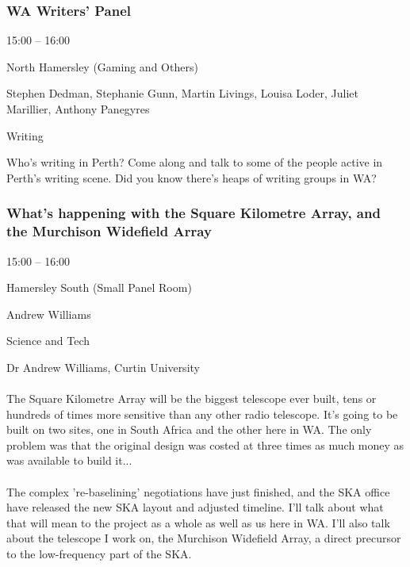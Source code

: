 \documentclass{scrreprt}
\begin{document}
\begin{multicols}{2}
\subsubsection*{WA Writers' Panel}\begin{description}
\setlength{\itemsep}{0pt}
\setlength{\parsep}{0pt}
\setlength{\parskip}{0pt}
\item[Time:]{15:00 -- 16:00}
\item[Venue:]{North Hamersley (Gaming and Others)}
\item[People:]{Stephen Dedman, Stephanie Gunn, Martin Livings, Louisa Loder, Juliet Marillier, Anthony Panegyres}
\item[Tags:]{Writing}\end{description}
Who's writing in Perth? Come along and talk to some of the people active in Perth's writing scene. Did you know there's heaps of writing groups in WA?
\subsubsection*{What's happening with the Square Kilometre Array, and the Murchison Widefield Array}\begin{description}
\setlength{\itemsep}{0pt}
\setlength{\parsep}{0pt}
\setlength{\parskip}{0pt}
\item[Time:]{15:00 -- 16:00}
\item[Venue:]{Hamersley South (Small Panel Room)}
\item[People:]{Andrew Williams}
\item[Tags:]{Science and Tech}\end{description}
Dr Andrew Williams, Curtin University\\\\The Square Kilometre Array will be the biggest telescope ever built, tens or hundreds of times more sensitive than any other radio telescope. It's going to be built on two sites, one in South Africa and the other here in WA. The only problem was that the original design was costed at three times as much money as was available to build it...\\\\The complex 're-baselining' negotiations have just finished, and the SKA office have released the new SKA layout and adjusted timeline. I'll talk about what that will mean to the project as a whole as well as us here in WA. I'll also talk about the telescope I work on, the Murchison Widefield Array, a direct precursor to the low-frequency part of the SKA.

\end{multicols}
\end{document}
